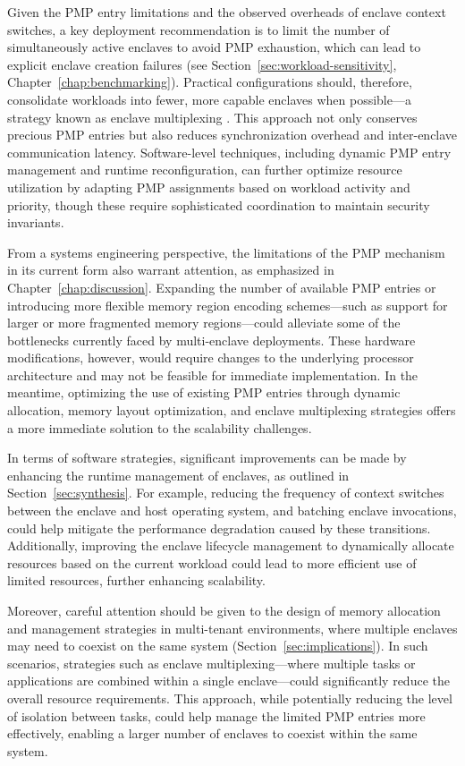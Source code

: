 Given the PMP entry limitations and the observed overheads of enclave context switches, a key deployment recommendation is to limit the number of simultaneously active enclaves to avoid PMP exhaustion, which can lead to explicit enclave creation failures (see Section~\ref{sec:workload-sensitivity}, Chapter~\ref{chap:benchmarking}). Practical configurations should, therefore, consolidate workloads into fewer, more capable enclaves when possible—a strategy known as enclave multiplexing \cite{Occlum2020}. This approach not only conserves precious PMP entries but also reduces synchronization overhead and inter-enclave communication latency. Software-level techniques, including dynamic PMP entry management and runtime reconfiguration, can further optimize resource utilization by adapting PMP assignments based on workload activity and priority, though these require sophisticated coordination to maintain security invariants.

From a systems engineering perspective, the limitations of the PMP mechanism in its current form also warrant attention, as emphasized in Chapter~\ref{chap:discussion}. Expanding the number of available PMP entries or introducing more flexible memory region encoding schemes—such as support for larger or more fragmented memory regions—could alleviate some of the bottlenecks currently faced by multi-enclave deployments. These hardware modifications, however, would require changes to the underlying processor architecture and may not be feasible for immediate implementation. In the meantime, optimizing the use of existing PMP entries through dynamic allocation, memory layout optimization, and enclave multiplexing strategies offers a more immediate solution to the scalability challenges.

In terms of software strategies, significant improvements can be made by enhancing the runtime management of enclaves, as outlined in Section~\ref{sec:synthesis}. For example, reducing the frequency of context switches between the enclave and host operating system, and batching enclave invocations, could help mitigate the performance degradation caused by these transitions. Additionally, improving the enclave lifecycle management to dynamically allocate resources based on the current workload could lead to more efficient use of limited resources, further enhancing scalability.

Moreover, careful attention should be given to the design of memory allocation and management strategies in multi-tenant environments, where multiple enclaves may need to coexist on the same system (Section~\ref{sec:implications}). In such scenarios, strategies such as enclave multiplexing—where multiple tasks or applications are combined within a single enclave—could significantly reduce the overall resource requirements. This approach, while potentially reducing the level of isolation between tasks, could help manage the limited PMP entries more effectively, enabling a larger number of enclaves to coexist within the same system.

